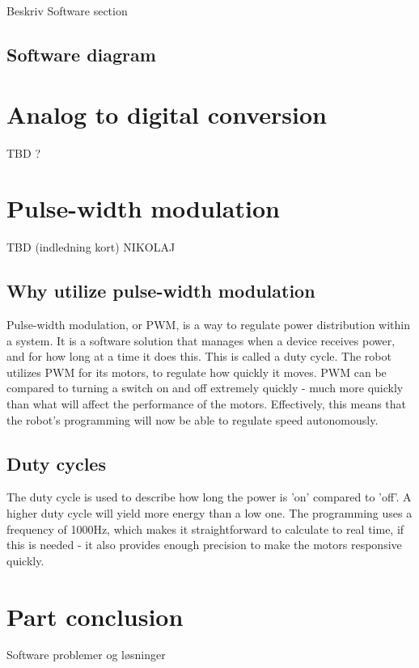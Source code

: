 
Beskriv Software section

\subsection{Software diagram}

\section{Analog to digital conversion}
TBD ?

\section{Pulse-width modulation}
TBD (indledning kort) NIKOLAJ
\subsection {Why utilize pulse-width modulation}

Pulse-width modulation, or PWM, is a way to regulate power distribution within a system. It is a software solution that manages when a device receives power, and for how long at a time it does this. This is called a duty cycle. The robot utilizes PWM for its motors, to regulate how quickly it moves. PWM can be compared to turning a switch on and off extremely quickly - much more quickly than what will affect the performance of the motors. Effectively, this means that the robot's programming will now be able to regulate speed autonomously. 
 
\subsection {Duty cycles}

The duty cycle is used to describe how long the power is 'on' compared to 'off'. A higher duty cycle will yield more energy than a low one. The programming uses a frequency of 1000Hz, which makes it straightforward to calculate to real time, if this is needed - it also provides enough precision to make the motors responsive quickly.

\section{Part conclusion}
Software problemer og løsninger